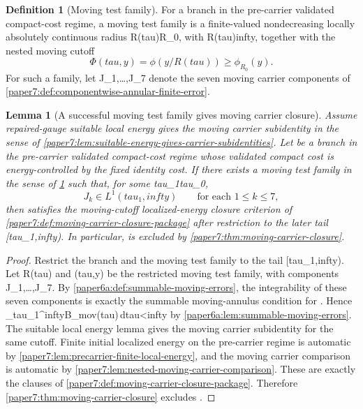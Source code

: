 \documentclass[11pt]{amsart}
\def\({}%
\def\){}%
\def\mathrm#1{#1}%
\def\tau{tau}%
\def\infty{infty}%
\theoremstyle{plain}
\newtheorem{lemma}[lemma]{Lemma}
\theoremstyle{definition}
\newtheorem{definition}[definition]{Definition}
\theoremstyle{remark}
\begin{document}
\begin{definition}[Moving test family]
\label{paper7:def:moving-test-family}
For a branch in the pre-carrier validated compact-cost regime, a moving test
family is a finite-valued nondecreasing locally absolutely continuous radius
\(R(\tau)\ge R_0\), with \(R(\tau)\to\infty\), together with the nested moving
cutoff
\[
  \Phi(\tau,y)=\phi(y/R(\tau))\ge\phi_{R_0}(y).
\]
For such a family, let \(J_1,\ldots,J_7\) denote the seven moving carrier
components of \cref{paper7:def:componentwise-annular-finite-error}.
\end{definition}

\begin{lemma}[A successful moving test family gives moving carrier closure]
\label{paper7:lem:successful-moving-test-family}
Assume repaired-gauge suitable local energy gives the moving carrier
subidentity in the sense of
\cref{paper7:lem:suitable-energy-gives-carrier-subidentities}.  Let \(\omega\)
be a branch in the pre-carrier validated compact-cost regime whose validated
compact cost is energy-controlled by the fixed identity cost.  If there exists
a moving test family in the sense of \cref{paper7:def:moving-test-family} such
that, for some \(\tau_1\ge\tau_0\),
\[
  J_k\in L^1(\tau_1,\infty)
  \qquad\text{for each }1\le k\le7,
\]
then \(\omega\) satisfies the moving-cutoff localized-energy closure criterion of
\cref{paper7:def:moving-carrier-closure-package} after restriction to the later
tail \([\tau_1,\infty)\).  In particular, \(\omega\) is excluded by
\cref{paper7:thm:moving-carrier-closure}.
\end{lemma}

\begin{proof}
Restrict the branch and the moving test family to the tail \([\tau_1,\infty)\).
Let \(R(\tau)\) and \(\Phi(\tau,y)\) be the restricted moving test family, with
components \(J_1,\ldots,J_7\).  By
\cref{paper6a:def:summable-moving-errors}, the integrability of these seven
components is exactly the summable moving-annulus condition for \(\Phi\).
Hence \(\int_{\tau_1}^\infty B_{\mathrm{mov}}(\tau)\,d\tau<\infty\) by
\cref{paper6a:lem:summable-moving-errors}.  The suitable local energy lemma
gives the moving carrier subidentity for the same cutoff.  Finite initial
localized energy on the pre-carrier regime is automatic by
\cref{paper7:lem:precarrier-finite-local-energy}, and the moving carrier
comparison is automatic by
\cref{paper7:lem:nested-moving-carrier-comparison}.  These are exactly the
clauses of \cref{paper7:def:moving-carrier-closure-package}.  Therefore
\cref{paper7:thm:moving-carrier-closure} excludes \(\omega\).
\end{proof}
\end{document}

